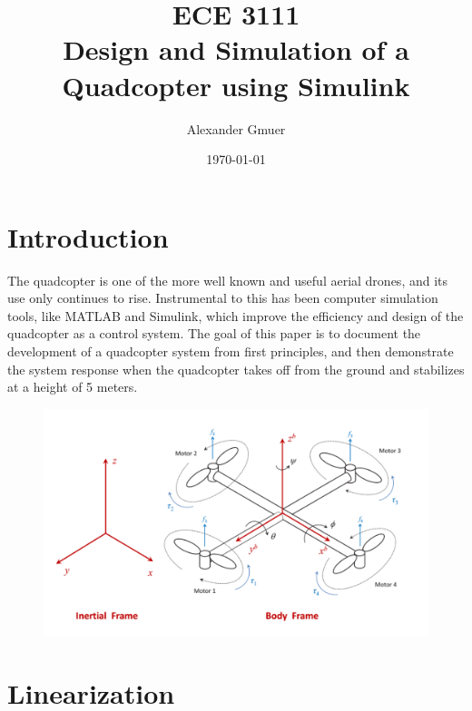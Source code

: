 \documentclass[12pt]{article}
\title{{\bf{ECE 3111}} \\ Design and Simulation of a Quadcopter using Simulink}
\author{Alexander Gmuer}
\date{\today}
\begin{document}
\maketitle

\section*{Introduction}

The quadcopter is one of the more well known and useful aerial drones, and its use only continues 
to rise. Instrumental to this has been computer simulation tools, like MATLAB and Simulink, which improve the 
efficiency and design of the quadcopter as a control system. The goal of this paper is to document the development 
of a quadcopter system from first principles, and then demonstrate the system response when the quadcopter takes off from
the ground and stabilizes at a height of 5 meters.  

\begin{figure}[h]
\includegraphics[scale=0.2]{images/Quadcopter Inertial Frame.png}
\centering
\end{figure}

\section{Linearization}
\end{document}
